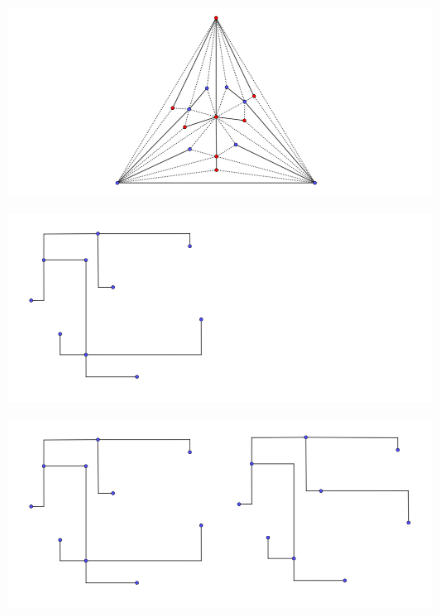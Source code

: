 \documentclass{beamer}
\begin{document}
\begin{frame}
\begin{figure}[h]
\includegraphics[width=\textwidth]{Tokunaga-5}
\end{figure}
\end{frame}
\begin{frame}
\begin{figure}[h]
\includegraphics[width=\textwidth]{Ejemplo-X-arbol}
\end{figure}
\end{frame}
\begin{frame}
\begin{figure}[h]
\includegraphics[width=\textwidth]{Ejemplo-X-arbol-2}
\end{figure}
\end{frame}
\end{document}

